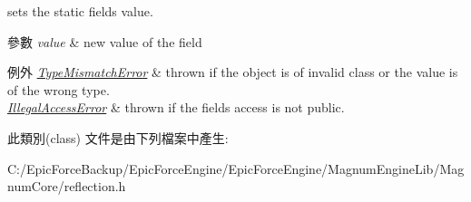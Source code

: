 sets the static field\textquotesingle{}s value. 


\begin{DoxyParams}{參數}
{\em value} & new value of the field \\
\hline
\end{DoxyParams}

\begin{DoxyExceptions}{例外}
{\em \hyperlink{classagm_1_1reflection_1_1_type_mismatch_error}{Type\+Mismatch\+Error}} & thrown if the object is of invalid class or the value is of the wrong type. \\
\hline
{\em \hyperlink{classagm_1_1reflection_1_1_illegal_access_error}{Illegal\+Access\+Error}} & thrown if the field\textquotesingle{}s access is not public. \\
\hline
\end{DoxyExceptions}


此類別(class) 文件是由下列檔案中產生\+:\begin{DoxyCompactItemize}
\item 
C\+:/\+Epic\+Force\+Backup/\+Epic\+Force\+Engine/\+Epic\+Force\+Engine/\+Magnum\+Engine\+Lib/\+Magnum\+Core/reflection.\+h\end{DoxyCompactItemize}
